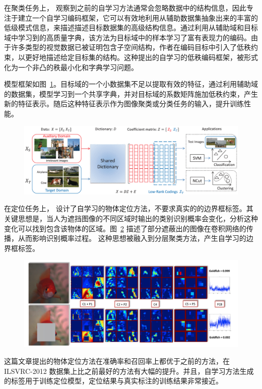 在聚类任务上，\citet{li2017self} 观察到之前的自学习方法通常会忽略数据中的结构信息，因此专注于建立一个自学习编码框架，它可以有效地利用从辅助数据集抽象出来的丰富的低级模式信息，来描述描述目标数据集的高级结构信息。通过利用从辅助域和目标域中学习到的高质量字典，该方法为目标域中的样本学习了富有表现力的编码。由于许多类型的视觉数据已被证明包含子空间结构，作者在编码目标中引入了低秩约束，以更好地描述给定目标集的结构。这种提出的自学习的低秩编码框架，被形式化为一个非凸的秩最小化和字典学习问题。

模型框架如图~\ref{c2_fig8}。目标域的一个小数据集不足以提取有效的特征，通过利用辅助域的数据集，模型学习到一个共享字典，并对目标域的系数矩阵施加低秩约束，产生新的特征表示。随后这种特征表示作为图像聚类或分类任务的输入，提升训练性能。
    \begin{figure}[tbp]
        \centering 
        \includegraphics[width=1.0\textwidth]{img/c2/rel_b2.png}
        \label{c2_fig8}
    \end{figure}

在定位任务上，\citet{bazzani2016self} 设计了自学习的物体定位方法，不要求真实的的边界框标签。其关键思想是，当人为遮挡图像的不同区域时输出的类别识别概率会变化，分析这种变化可以找到包含该物体的区域。图~\ref{c2_fig9} 描述了部分遮蔽出的图像在卷积网络的传播，从而影响识别概率过程。
这种思想被融入到分层聚类方法，产生自学习的边界框标签。
    \begin{figure}[tbp]
        \centering 
        \includegraphics[width=1.0\textwidth]{img/c2/rel_b3.png}
        \label{c2_fig9}
    \end{figure}
这篇文章提出的物体定位方法在准确率和召回率上都优于之前的方法，在 ILSVRC-2012 数据集上比之前最好的方法有大幅的提升。并且，自学习方法生成的标签用于训练定位模型，定位结果与真实标注的训练结果非常接近。

